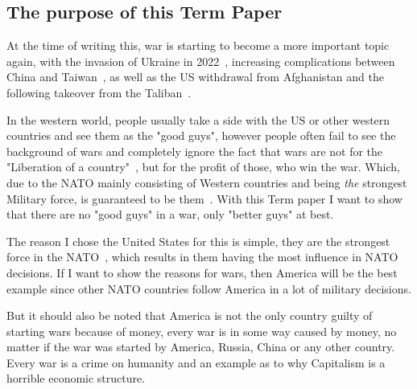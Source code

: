 \subsection{The purpose of this Term Paper}
At the time of writing this, war is starting to become a more important topic again, with the invasion of Ukraine in 2022~\autocite{bbc-invasion-ukraine}, increasing complications between China and Taiwan~\autocite{bbc-china-taiwan}, as well as the US withdrawal from Afghanistan and the following takeover from the Taliban~\autocite{cfr-afghanistan}.

In the western world, people usually take a side with the US or other western countries and see them as the "good guys", however people often fail to see the background of wars and completely ignore the fact that  wars are not for the "Liberation of a country"~\autocite{george-bush-liberation-iraq}, but for the profit of those, who win the war. Which, due to the NATO mainly consisting of Western countries and being \emph{the} strongest Military force, is guaranteed to be them~\autocite{nato-strongest-force}.
With this Term paper I want to show that there are no "good guys" in a war, only "better guys" at best.

The reason I chose the United States for this is simple, they are the strongest force in the NATO~\autocite{statista-nato-aircraft-strength}, which results in them having the most influence in NATO decisions. If I want to show the reasons for wars, then America will be the best example since other NATO countries follow America in a lot of military decisions.

But it should also be noted that America is not the only country guilty of starting wars because of money, every war is in some way caused by money, no matter if the war was started by America, Russia, China or any other country. Every war is a crime on humanity and an example as to why Capitalism is a horrible economic structure.
